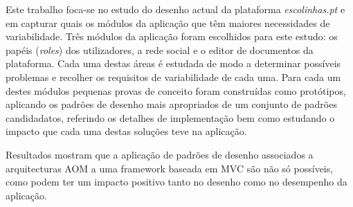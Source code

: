 Este trabalho foca-se no estudo do desenho actual da plataforma \emph{escolinhas.pt} e em capturar quais os módulos da aplicação que têm maiores necessidades de variabilidade. Três módulos da aplicação foram escolhidos para este estudo: os papéis (\emph{roles}) dos utilizadores, a rede social e o editor de documentos da plataforma. Cada uma destas áreas é estudada de modo a determinar possíveis problemas e recolher os requisitos de variabilidade de cada uma. Para cada um destes módulos pequenas provas de conceito foram construídas como protótipos, aplicando os padrões de desenho mais apropriados de um conjunto de padrões candidadatos, referindo os detalhes de implementação bem como estudando o impacto que cada uma destas soluções teve na aplicação.

Resultados mostram que a aplicação de padrões de desenho associados a arquitecturas AOM a uma framework baseada em MVC são não só possíveis, como podem ter um impacto positivo tanto no desenho como no desempenho da aplicação.
